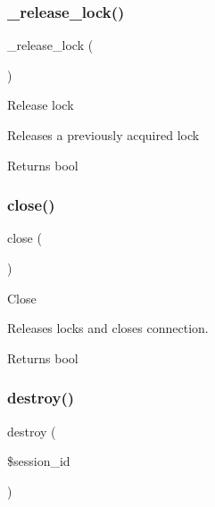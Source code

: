 \subsubsection{\texorpdfstring{\+\_\+release\+\_\+lock()}{\_release\_lock()}}
{\footnotesize\ttfamily \+\_\+release\+\_\+lock (\begin{DoxyParamCaption}{ }\end{DoxyParamCaption})\hspace{0.3cm}{\ttfamily [protected]}}

Release lock

Releases a previously acquired lock

\begin{DoxyReturn}{Returns}
bool 
\end{DoxyReturn}
\mbox{\label{class_c_i___session__redis__driver_aa69c8bf1f1dcf4e72552efff1fe3e87e}} 
\subsubsection{\texorpdfstring{close()}{close()}}
{\footnotesize\ttfamily close (\begin{DoxyParamCaption}{ }\end{DoxyParamCaption})}

Close

Releases locks and closes connection.

\begin{DoxyReturn}{Returns}
bool 
\end{DoxyReturn}
\mbox{\label{class_c_i___session__redis__driver_aaec5812f6b4eb6835f88d3baa06a002a}} 
\subsubsection{\texorpdfstring{destroy()}{destroy()}}
{\footnotesize\ttfamily destroy (\begin{DoxyParamCaption}\item[{}]{\$session\+\_\+id }\end{DoxyParamCaption})}

